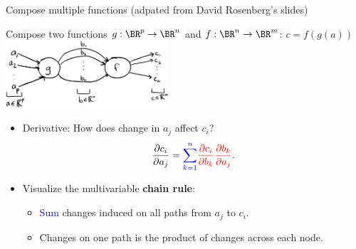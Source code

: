 \documentclass[usenames,dvipsnames,notes,11pt,aspectratio=169,hyperref={colorlinks=true, linkcolor=blue}]{beamer}
\begin{document}
\begin{frame}
{Compose multiple functions}
    {(adpated from David Rosenberg's slides)}

Compose two functions $g:\BR^{p}\to\BR^{n}$ and $f:\BR^{n}\to\BR^{m}$: $c=f(g(a))$
\\
\includegraphics[height=2.5cm]{figures/two-fn-comp-graph-partials}
\\

\pause
\begin{itemize}
\item Derivative: How does change in $a_j$ affect $c_i$?
    \pause
$$
\frac{\partial c_{i}}{\partial a_{j}}={\color{blue}\sum_{k=1}^{n}}
{\color{red} \frac{\partial c_{i}}{\partial b_{k}}\frac{\partial b_{k}}{\partial a_{j}}} .
$$
        \vspace{-1em}
\pause
\item Visualize the multivariable \textbf{chain rule}:
\begin{itemize}
\item \textcolor{blue}{Sum} changes induced on all paths from $a_j$ to $c_i$.
\item Changes on one path is the {\color{red}product} of changes across each node.
\end{itemize} 
\end{itemize}
\end{frame}
\end{document}
